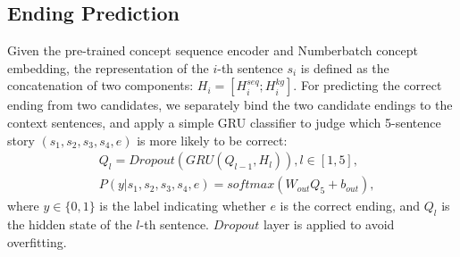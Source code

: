 %
%

\subsection{Ending Prediction}
\label{sec:classifier}

Given the pre-trained concept sequence encoder and
Numberbatch concept embedding,
the representation of the $i$-th sentence $s_i$ is defined as
the concatenation of two components: $H_i=[H_i^{seq}; H_i^{kg}]$.
For predicting the correct ending from two candidates,
we separately bind the two candidate endings to the context sentences,
and apply a simple GRU classifier to judge
which 5-sentence story $(s_1, s_2, s_3, s_4, e)$
is more likely to be correct:
\begin{equation}
  \begin{aligned}
  & Q_l = Dropout(GRU(Q_{l-1}, H_l)), l \in [1, 5], \\
  & P(y|s_1, s_2, s_3, s_4, e) = softmax(W_{out} Q_5 + b_{out}),
\end{aligned}
\end{equation}
where $y \in \{0, 1\}$ is the label indicating whether $e$ is the
correct ending, and $Q_l$ is the hidden state of the $l$-th sentence.
$Dropout$ layer is applied to avoid overfitting.
